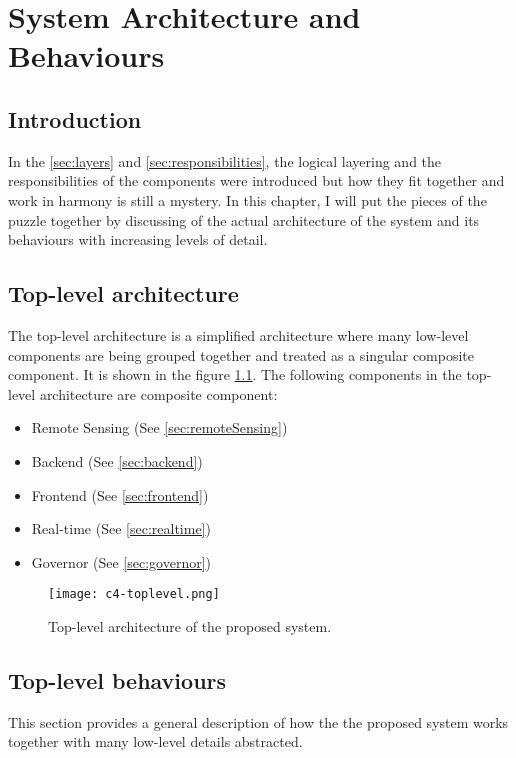 \documentclass[../thesis.tex]{subfiles}
\begin{document}
\chapter{System Architecture and Behaviours}

\section{Introduction}

In the \autoref{sec:layers} and \autoref{sec:responsibilities}, the logical layering and the responsibilities of the components were introduced but how they fit together and work in harmony is still a mystery. In this chapter, I will put the pieces of the puzzle together by discussing of the actual architecture of the system and its behaviours with increasing levels of detail. 


\section{Top-level architecture}

The top-level architecture is a simplified architecture where many low-level components are being grouped together and treated as a singular composite component. It is shown in the figure \ref{fig:toplevel}. The following components in the top-level architecture are composite component:

\begin{itemize}
	\item Remote Sensing (See \autoref{sec:remoteSensing})
	\item Backend (See \autoref{sec:backend})
	\item Frontend (See \autoref{sec:frontend})
	\item Real-time (See \autoref{sec:realtime})
	\item Governor (See \autoref{sec:governor})
\end{itemize}


\begin{figure}[!ht]
	\centering
	\texttt{[image: c4-toplevel.png]}
	\caption{Top-level architecture of the proposed system.}
	\label{fig:toplevel}
\end{figure}

\section{Top-level behaviours}

This section provides a general description of how the the proposed system works together with many low-level details abstracted. 
\end{document}

